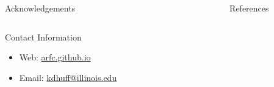 \documentclass[final]{beamer}
\newlength{\sepwid}
\newlength{\onecolwid}
\newlength{\threecolwid}
\begin{document}
\begin{frame}[t]
\begin{columns}[t,totalwidth=\threecolwid]
\begin{column}{\onecolwid}
\begin{block}{Acknowledgements}
\begin{center}
\begin{tabular}{cccc}
\end{tabular}
\end{center}


\end{block}





\begin{alertblock}{Contact Information}
\begin{itemize}
	
	\item Web: \href{arfc.github.io}{arfc.github.io}
	\item Email: \href{mailto:kdhuff@illinois.edu}{kdhuff@illinois.edu}
\end{itemize}

\end{alertblock}


\end{column} %

\begin{column}{\sepwid}\end{column} %

\begin{column}{\onecolwid} %


\begin{block}{References}

        {\footnotesize 
        }
\end{block}





\end{column} %

\end{columns} %

\end{frame} %
\end{document}
